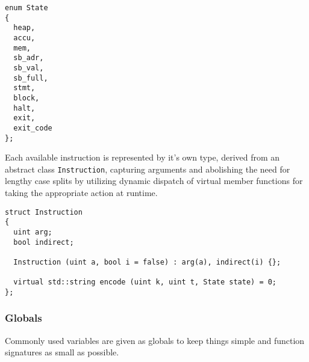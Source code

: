 \begin{lstlisting}[style=c++]
enum State
{
  heap,
  accu,
  mem,
  sb_adr,
  sb_val,
  sb_full,
  stmt,
  block,
  halt,
  exit,
  exit_code
};
\end{lstlisting}
Each available instruction is represented by it's own type, derived from an abstract class \texttt{Instruction}, capturing arguments and abolishing the need for lengthy case splits by utilizing dynamic dispatch of virtual member functions for taking the appropriate action at runtime.%
\begin{lstlisting}[style=c++]
struct Instruction
{
  uint arg;
  bool indirect;

  Instruction (uint a, bool i = false) : arg(a), indirect(i) {};

  virtual std::string encode (uint k, uint t, State state) = 0;
};
\end{lstlisting}

\subsubsection{Globals}

Commonly used variables are given as globals to keep things simple and function signatures as small as possible.

